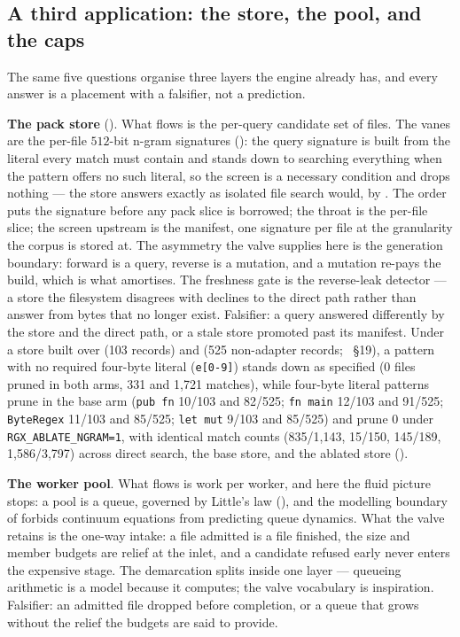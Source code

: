 \documentclass[11pt,letterpaper]{article}
\begin{document}
\subsection{A third application: the store, the pool, and the caps}
\label{sec:calculus:third}
The same five questions organise three layers the engine already has,
and every answer is a placement with a falsifier, not a prediction.

\textbf{The pack store} (). What flows is the
per-query candidate set of files. The vanes are the per-file $512$-bit
n-gram signatures (): the query signature is built from
the literal every match must contain and stands down to searching
everything when the pattern offers no such literal, so the screen is a
necessary condition and drops nothing --- the store answers exactly as
isolated file search would, by . The order puts
the signature before any pack slice is borrowed; the throat is the
per-file slice; the screen upstream is the manifest, one signature per
file at the granularity the corpus is stored at. The asymmetry the
valve supplies here is the generation boundary: forward is a query,
reverse is a mutation, and a mutation re-pays the build, which is what
 amortises. The freshness gate is the reverse-leak
detector --- a store the filesystem disagrees with declines to the
direct path rather than answer from bytes that no longer exist.
Falsifier: a query answered differently by the store and the direct
path, or a stale store promoted past its manifest. Under a store built
over  (103 records) and  (525
non-adapter records; ~\S 19), a pattern with
no required four-byte literal (\texttt{e[0-9]}) stands down as specified
(0 files pruned in both arms, 331 and 1{,}721 matches), while four-byte
literal patterns prune in the base arm (\texttt{pub fn} 10/103 and
82/525; \texttt{fn main} 12/103 and 91/525; \texttt{ByteRegex} 11/103
and 85/525; \texttt{let mut} 9/103 and 85/525) and prune 0 under
\texttt{RGX\_ABLATE\_NGRAM=1}, with identical match counts (835/1{,}143,
15/150, 145/189, 1{,}586/3{,}797) across direct search, the base store,
and the ablated store ().

\textbf{The worker pool}. What flows is work per worker, and here the
fluid picture stops: a pool is a queue, governed by Little's law
(), and the modelling boundary of 
forbids continuum equations from predicting queue dynamics. What the
valve retains is the one-way intake: a file admitted is a file
finished, the size and member budgets are relief at the inlet, and a
candidate refused early never enters the expensive stage. The
demarcation splits inside one layer --- queueing arithmetic is a model
because it computes; the valve vocabulary is inspiration. Falsifier: an
admitted file dropped before completion, or a queue that grows without
the relief the budgets are said to provide.
\end{document}
